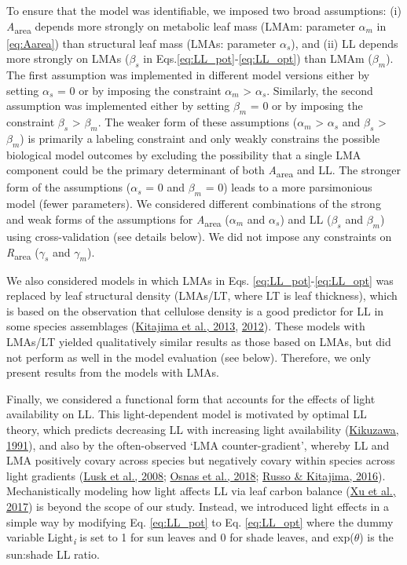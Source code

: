 \documentclass[
  12pt,
  a4paper,
,tablecaptionabove
]{scrartcl}
\begin{document}
To ensure that the model was identifiable, we imposed two broad
assumptions: (i) \emph{A}\textsubscript{area} depends more strongly on
metabolic leaf mass (LMAm: parameter \(\alpha_m\) in \ref{eq:Aarea})
than structural leaf mass (LMAs: parameter \(\alpha_s\)), and (ii) LL
depends more strongly on LMAs (\(\beta_s\) in
Eqs.\ref{eq:LL_pot}-\ref{eq:LL_opt}) than LMAm (\(\beta_m\)). The first
assumption was implemented in different model versions either by setting
\(\alpha_s\) = 0 or by imposing the constraint \(\alpha_m\)
\textgreater{} \(\alpha_s\). Similarly, the second assumption was
implemented either by setting \(\beta_m\) = 0 or by imposing the
constraint \(\beta_s\) \textgreater{} \(\beta_m\). The weaker form of
these assumptions (\(\alpha_m\) \textgreater{} \(\alpha_s\) and
\(\beta_s\) \textgreater{} \(\beta_m\)) is primarily a labeling
constraint and only weakly constrains the possible biological model
outcomes by excluding the possibility that a single LMA component could
be the primary determinant of both \emph{A}\textsubscript{area} and LL.
The stronger form of the assumptions (\(\alpha_s\) = 0 and \(\beta_m\) =
0) leads to a more parsimonious model (fewer parameters). We considered
different combinations of the strong and weak forms of the assumptions
for \emph{A}\textsubscript{area} (\(\alpha_m\) and \(\alpha_s\)) and LL
(\(\beta_s\) and \(\beta_m\)) using cross-validation (see details
below). We did not impose any constraints on
\emph{R}\textsubscript{area} (\(\gamma_s\) and \(\gamma_m\)).

We also considered models in which LMAs in Eqs.
\ref{eq:LL_pot}-\ref{eq:LL_opt} was replaced by leaf structural density
(LMAs/LT, where LT is leaf thickness), which is based on the observation
that cellulose density is a good predictor for LL in some species
assemblages (\protect\hyperlink{ref-Kitajima2013}{Kitajima et al.,
2013}, \protect\hyperlink{ref-Kitajima2012}{2012}). These models with
LMAs/LT yielded qualitatively similar results as those based on LMAs,
but did not perform as well in the model evaluation (see below).
Therefore, we only present results from the models with LMAs.

Finally, we considered a functional form that accounts for the effects
of light availability on LL. This light-dependent model is motivated by
optimal LL theory, which predicts decreasing LL with increasing light
availability (\protect\hyperlink{ref-Kikuzawa1991}{Kikuzawa, 1991}), and
also by the often-observed `LMA counter-gradient', whereby LL and LMA
positively covary across species but negatively covary within species
across light gradients (\protect\hyperlink{ref-Lusk2008}{Lusk et al.,
2008}; \protect\hyperlink{ref-Osnas2018}{Osnas et al., 2018};
\protect\hyperlink{ref-Russo2016}{Russo \& Kitajima, 2016}).
Mechanistically modeling how light affects LL via leaf carbon balance
(\protect\hyperlink{ref-Xu2017}{Xu et al., 2017}) is beyond the scope of
our study. Instead, we introduced light effects in a simple way by
modifying Eq. \ref{eq:LL_pot} to Eq. \ref{eq:LL_opt} where the dummy
variable Light\textsubscript{\emph{i}} is set to 1 for sun leaves and 0
for shade leaves, and exp(\(\theta\)) is the sun:shade LL ratio.
\end{document}
